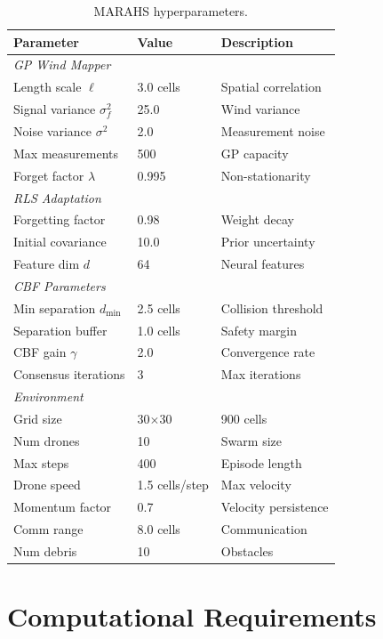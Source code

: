 \documentclass[12pt,a4paper,twocolumn]{article}
\begin{document}
\begin{enumerate}[leftmargin=*]
\begin{table}[htbp]
\centering
\caption{MARAHS hyperparameters.}
\label{tab:hyperparams}
\small
\begin{tabular}{lll}
\toprule
\textbf{Parameter} & \textbf{Value} & \textbf{Description} \\
\midrule
\multicolumn{3}{l}{\textit{GP Wind Mapper}} \\
Length scale $\ell$ & 3.0 cells & Spatial correlation \\
Signal variance $\sigma_f^2$ & 25.0 & Wind variance \\
Noise variance $\sigma^2$ & 2.0 & Measurement noise \\
Max measurements & 500 & GP capacity \\
Forget factor $\lambda$ & 0.995 & Non-stationarity \\
\midrule
\multicolumn{3}{l}{\textit{RLS Adaptation}} \\
Forgetting factor & 0.98 & Weight decay \\
Initial covariance & 10.0 & Prior uncertainty \\
Feature dim $d$ & 64 & Neural features \\
\midrule
\multicolumn{3}{l}{\textit{CBF Parameters}} \\
Min separation $d_{\min}$ & 2.5 cells & Collision threshold \\
Separation buffer & 1.0 cells & Safety margin \\
CBF gain $\gamma$ & 2.0 & Convergence rate \\
Consensus iterations & 3 & Max iterations \\
\midrule
\multicolumn{3}{l}{\textit{Environment}} \\
Grid size & 30$\times$30 & 900 cells \\
Num drones & 10 & Swarm size \\
Max steps & 400 & Episode length \\
Drone speed & 1.5 cells/step & Max velocity \\
Momentum factor & 0.7 & Velocity persistence \\
Comm range & 8.0 cells & Communication \\
Num debris & 10 & Obstacles \\
\bottomrule
\end{tabular}
\end{table}

\section{Computational Requirements}
\label{app:compute}


\end{enumerate}
\end{document}
